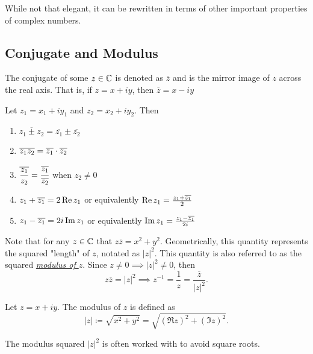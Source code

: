\documentclass[../notes.tex]{subfiles}
\begin{document}
While not that elegant, it can be rewritten in terms of other important properties of complex numbers.

\subsection{Conjugate and Modulus}

\begin{definition}[Conjugate]
    The conjugate of some $z \in \mathbb{C}$ is denoted as $\overline{z}$ and is the mirror image of $z$ across the real axis. That is, if $z = x + iy$, then $\overline{z} = x - iy$
\end{definition}

\begin{theorem}
    \label{thm:propsconjugate}
    Let $z_1 = x_1 + iy_1$ and $z_2 = x_2 + iy_2$. Then
    \begin{enumerate}
        \item $\overline{z_1 \pm z_2} = \overline{z_1} \pm \overline{z_2}$
        \item $\overline{z_1 z_2} = \overline{z_1} \cdot \overline{z_2}$
        \item $\displaystyle \overline{\frac{z_1}{z_2}} = \cfrac{\overline{z_1}}{\overline{z_2}}$ when $z_2 \neq 0$
        \item $z_1 + \overline{z_1} = 2 \Re z_1$ or equivalently $\Re z_1 = \frac{z_1 + \overline{z_1}}{2}$
        \item $z_1 - \overline{z_1} = 2i \Im z_1$ or equivalently $\Im z_1 = \frac{z_1 - \overline{z_1}}{2i}$
    \end{enumerate}
\end{theorem}

Note that for any $z \in \mathbb{C}$ that $z \overline{z} = x^2 + y^2$. Geometrically, this quantity represents the squared "length" of $z$, notated as $|z|^2$. This quantity is also referred to as the squared \hyperref[def:modulus]{\textit{modulus of $z$}}. Since $z \neq 0 \implies |z|^2 \neq 0$, then
\[
    z \overline{z} = |z|^2 \implies z^{-1} = \frac{1}{z} = \frac{\overline{z}}{|z|^2}
.\]

\begin{definition}[Modulus]
    \label{def:modulus}
    Let $z = x + iy$. The modulus of $z$ is defined as 
    \[
        |z| \coloneq \sqrt{x^2 + y^2} = \sqrt{(\Re z)^2 + (\Im z)^2}
    .\]
    \begin{remark}
        The modulus squared $|z|^2$ is often worked with to avoid square roots.
    \end{remark}
\end{definition}
\end{document}
